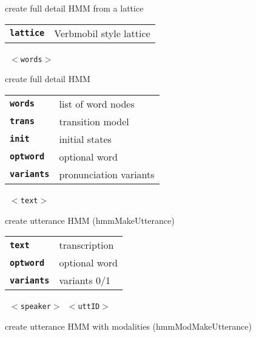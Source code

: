 \begin{description}
\begin{description}
        create full detail HMM from a lattice

      \begin{tabular}{ll}
 \texttt{\textbf{lattice}} &  Verbmobil style lattice  \\
      \end{tabular}
       \texttt{ $<$words$>$    } \

        create full detail HMM

      \begin{tabular}{ll}
 \texttt{\textbf{words}} &    list of word nodes \\
 \texttt{\textbf{trans}} &     transition model  \\
 \texttt{\textbf{init}} &      initial states \\
 \texttt{\textbf{optword}} &   optional word \\
 \texttt{\textbf{variants}} &  pronunciation variants  \\
      \end{tabular}
       \texttt{ $<$text$>$  } \

        create utterance HMM (hmmMakeUtterance)

      \begin{tabular}{ll}
 \texttt{\textbf{text}} &       transcription  \\
 \texttt{\textbf{optword}} &     optional word  \\
 \texttt{\textbf{variants}} &    variants 0/1  \\
      \end{tabular}
       \texttt{ $<$speaker$>$ $<$uttID$>$         } \

        create utterance HMM with modalities (hmmModMakeUtterance)


\end{description}
\end{description}
